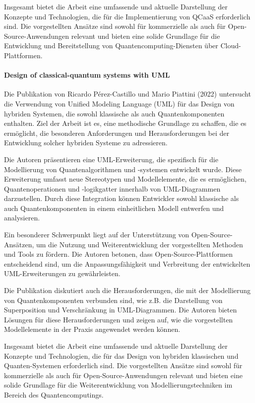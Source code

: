 Insgesamt bietet die Arbeit eine umfassende und aktuelle Darstellung der Konzepte und Technologien, die 
für die Implementierung von QCaaS erforderlich sind. Die vorgestellten Ansätze sind sowohl für 
kommerzielle als auch für Open-Source-Anwendungen relevant und bieten eine solide Grundlage für die 
Entwicklung und Bereitstellung von Quantencomputing-Diensten über Cloud-Plattformen.

\paragraph{Design of classical-quantum systems with UML}

Die Publikation von Ricardo Pérez-Castillo und Mario Piattini (2022) \cite{Perez-Castillo_2022} untersucht die Verwendung von Unified Modeling 
Language (UML) für das Design von hybriden Systemen, die sowohl klassische als auch Quantenkomponenten enthalten. 
Ziel der Arbeit ist es, eine methodische Grundlage zu schaffen, die es ermöglicht, die besonderen Anforderungen und 
Herausforderungen bei der Entwicklung solcher hybriden Systeme zu adressieren.

Die Autoren präsentieren eine UML-Erweiterung, die spezifisch für die Modellierung von Quantenalgorithmen und -systemen 
entwickelt wurde. Diese Erweiterung umfasst neue Stereotypen und Modellelemente, die es ermöglichen, Quantenoperationen 
und -logikgatter innerhalb von UML-Diagrammen darzustellen. Durch diese Integration können Entwickler sowohl klassische 
als auch Quantenkomponenten in einem einheitlichen Modell entwerfen und analysieren.

Ein besonderer Schwerpunkt liegt auf der Unterstützung von Open-Source-Ansätzen, um die Nutzung und Weiterentwicklung der 
vorgestellten Methoden und Tools zu fördern. Die Autoren betonen, dass Open-Source-Plattformen entscheidend sind, um die 
Anpassungsfähigkeit und Verbreitung der entwickelten UML-Erweiterungen zu gewährleisten.

Die Publikation diskutiert auch die Herausforderungen, die mit der Modellierung von Quantenkomponenten verbunden sind, 
wie z.B. die Darstellung von Superposition und Verschränkung in UML-Diagrammen. Die Autoren bieten Lösungen für diese 
Herausforderungen und zeigen auf, wie die vorgestellten Modellelemente in der Praxis angewendet werden können.

Insgesamt bietet die Arbeit eine umfassende und aktuelle Darstellung der Konzepte und Technologien, die für das Design 
von hybriden klassischen und Quanten-Systemen erforderlich sind. Die vorgestellten Ansätze sind sowohl für kommerzielle 
als auch für Open-Source-Anwendungen relevant und bieten eine solide Grundlage für die Weiterentwicklung von Modellierungstechniken 
im Bereich des Quantencomputings.

